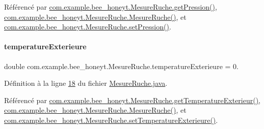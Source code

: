Référencé par \hyperlink{_mesure_ruche_8java_source_l00092}{com.\+example.\+bee\+\_\+honeyt.\+Mesure\+Ruche.\+get\+Pression()}, \hyperlink{_mesure_ruche_8java_source_l00030}{com.\+example.\+bee\+\_\+honeyt.\+Mesure\+Ruche.\+Mesure\+Ruche()}, et \hyperlink{_mesure_ruche_8java_source_l00097}{com.\+example.\+bee\+\_\+honeyt.\+Mesure\+Ruche.\+set\+Pression()}.

\mbox{\label{classcom_1_1example_1_1bee__honeyt_1_1_mesure_ruche_ac13ff0ed6c96cf755097510acf202521}} 
\paragraph{\texorpdfstring{temperature\+Exterieure}{temperatureExterieure}}
{\footnotesize\ttfamily double com.\+example.\+bee\+\_\+honeyt.\+Mesure\+Ruche.\+temperature\+Exterieure = 0.\hspace{0.3cm}{\ttfamily [private]}}



Définition à la ligne \hyperlink{_mesure_ruche_8java_source_l00018}{18} du fichier \hyperlink{_mesure_ruche_8java_source}{Mesure\+Ruche.\+java}.



Référencé par \hyperlink{_mesure_ruche_8java_source_l00062}{com.\+example.\+bee\+\_\+honeyt.\+Mesure\+Ruche.\+get\+Temperature\+Exterieur()}, \hyperlink{_mesure_ruche_8java_source_l00030}{com.\+example.\+bee\+\_\+honeyt.\+Mesure\+Ruche.\+Mesure\+Ruche()}, et \hyperlink{_mesure_ruche_8java_source_l00067}{com.\+example.\+bee\+\_\+honeyt.\+Mesure\+Ruche.\+set\+Temperature\+Exterieure()}.

\mbox{\label{classcom_1_1example_1_1bee__honeyt_1_1_mesure_ruche_afd0ecabb4e519d5bcfee33ac15b8b742}} 
